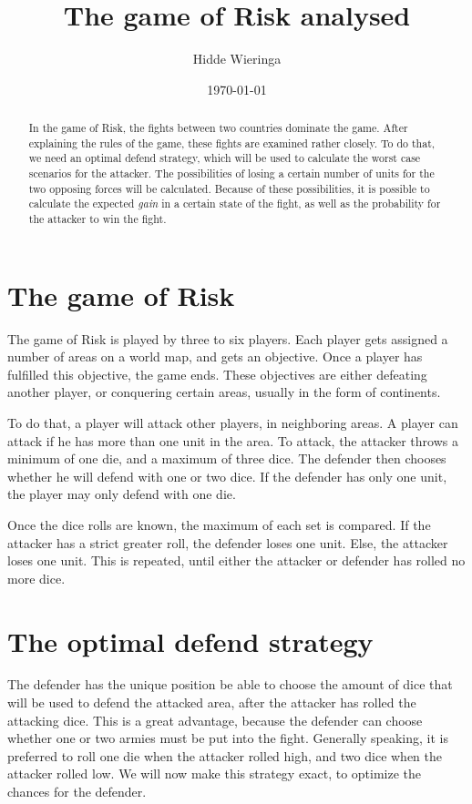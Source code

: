 \documentclass{amsart}
\title{The game of Risk analysed}
\author{Hidde Wieringa}
\date{\today}
\begin{document}
	
	\begin{abstract}
		In the game of Risk, the fights between two countries dominate the game. After explaining the rules of the game, these fights are examined rather closely. To do that, we need an optimal defend strategy, which will be used to calculate the worst case scenarios for the attacker. The possibilities of losing a certain number of units for the two opposing forces will be calculated. Because of these possibilities, it is possible to calculate the expected \emph{gain} in a certain state of the fight, as well as the probability for the attacker to win the fight.
	\end{abstract}
	
	\maketitle
	
	\section{The game of Risk}
	
	The game of Risk is played by three to six players. Each player gets assigned a number of areas on a world map, and gets an objective. Once a player has fulfilled this objective, the game ends. These objectives are either defeating another player, or conquering certain areas, usually in the form of continents. 
	
	To do that, a player will attack other players, in neighboring areas. A player can attack if he has more than one unit in the area. To attack, the attacker throws a minimum of one die, and a maximum of three dice. The defender then chooses whether he will defend with one or two dice. If the defender has only one unit, the player may only defend with one die. 
	
	Once the dice rolls are known, the maximum of each set is compared. If the attacker has a strict greater roll, the defender loses one unit. Else, the attacker loses one unit. This is repeated, until either the attacker or defender has rolled no more dice. 
	
	\section{The optimal defend strategy}
	
	The defender has the unique position be able to choose the amount of dice that will be used to defend the attacked area, after the attacker has rolled the attacking dice. This is a great advantage, because the defender can choose whether one or two armies must be put into the fight. Generally speaking, it is preferred to roll one die when the attacker rolled high, and two dice when the attacker rolled low. We will now make this strategy exact, to optimize the chances for the defender. 
	
\end{document}
